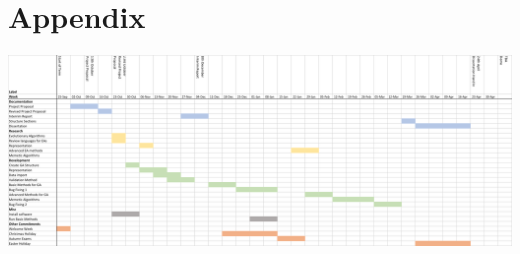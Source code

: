 \documentclass[a4paper]{article}
\begin{document}
\section{Appendix}



\includegraphics{workPlan}
\end{document}
